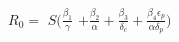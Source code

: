 \documentclass[preview]{standalone}
\begin{document}
\begin{center}
$R_0 =$ $S (\frac{\beta_1}{\gamma}$ $+ \frac{\beta_2}{\alpha} + \frac{\beta_3}{\delta_c} + \frac{\beta_4 \epsilon_p}{\alpha \delta_p} )$
\end{center}
\end{document}
